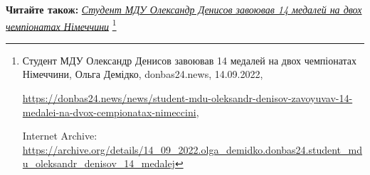  
 
 
 
 


\textbf{Читайте також:} \href{https://archive.org/details/14_09_2022.olga_demidko.donbas24.student_mdu_oleksandr_denisov_14_medalej}{\emph{Студент МДУ Олександр Денисов завоював 14 медалей на двох чемпіонатах Німеччини}}%
\footnote{Студент МДУ Олександр Денисов завоював 14 медалей на двох чемпіонатах Німеччини, Ольга Демідко, donbas24.news, 14.09.2022, \par%
\url{https://donbas24.news/news/student-mdu-oleksandr-denisov-zavoyuvav-14-medalei-na-dvox-cempionatax-nimeccini}, \par%
Internet Archive: \url{https://archive.org/details/14_09_2022.olga_demidko.donbas24.student_mdu_oleksandr_denisov_14_medalej}%
}
